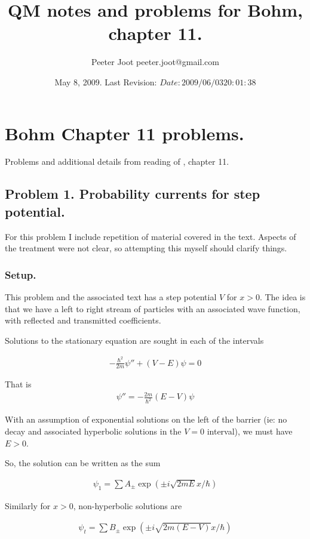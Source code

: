 \documentclass{article}
\title{ QM notes and problems for Bohm, chapter 11. }
\author{Peeter Joot \quad peeter.joot@gmail.com }
\date{ May 8, 2009.  Last Revision: $Date: 2009/06/03 20:01:38 $ }
\begin{document}
\maketitle{}
\tableofcontents
\section{Bohm Chapter 11 problems. }

Problems and additional details from reading of \cite{bohm1989qt}, chapter 11.

\subsection{Problem 1.  Probability currents for step potential. }

For this problem I include repetition of material covered in the text.
Aspects of the treatment were not clear, so attempting this myself
should clarify things.

\subsubsection{Setup. }

This problem and the associated text has a step potential $V$ for $x>0$.  The
idea is that we have a left to right stream of particles with an associated
wave function, with reflected and transmitted coefficients.

Solutions to the stationary equation are sought in each of the intervals

\begin{align}
-\frac{\hbar^2}{2m}\psi'' + (V-E)\psi = 0
\end{align}

That is
\begin{align}
\psi'' = - \frac{2m}{\hbar^2} (E-V)\psi
\end{align}

With an assumption of exponential solutions on the left of the barrier
(ie: no decay and associated hyperbolic solutions in the $V=0$ interval),
we must have $E>0$.

So, the solution can be written as the sum

\begin{align*}
\psi_1 = \sum A_{\pm} \exp\left( \pm i \sqrt{2mE} x / \hbar \right)
\end{align*}

Similarly for $x>0$, non-hyperbolic solutions are

\begin{align*}
\psi_t = \sum B_{\pm} \exp\left( \pm i \sqrt{2m(E-V)} x / \hbar \right)
\end{align*}
\end{document}
